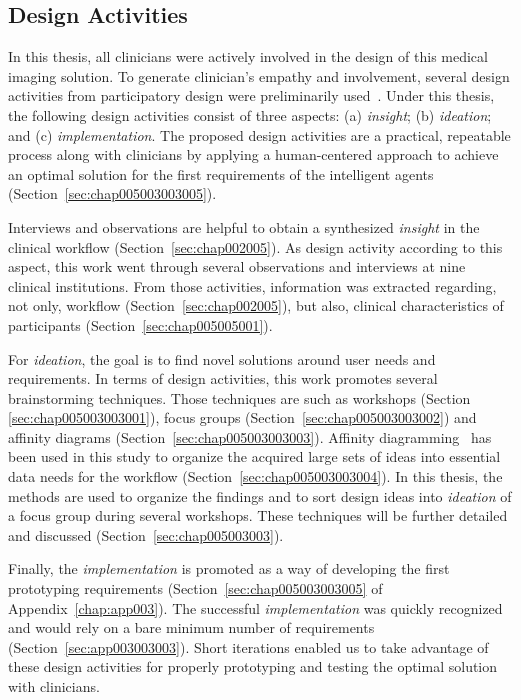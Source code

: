 \subsection{Design Activities}
\label{sec:chap005003001}

In this thesis, all clinicians were actively involved in the design of this medical imaging solution.
To generate clinician's empathy and involvement, several design activities from participatory design were preliminarily used~\cite{10.1145/3308558.3314123}.
Under this thesis, the following design activities consist of three aspects: (a) {\it insight}; (b) {\it ideation}; and (c) {\it implementation}.
The proposed design activities are a practical, repeatable process along with clinicians by applying a human-centered approach to achieve an optimal solution for the first requirements of the intelligent agents (Section~\ref{sec:chap005003003005}).

Interviews and observations are helpful to obtain a synthesized {\it insight} in the clinical workflow (Section~\ref{sec:chap002005}).
As design activity according to this aspect, this work went through several observations and interviews at nine clinical institutions.
From those activities, information was extracted regarding, not only, workflow (Section~\ref{sec:chap002005}), but also, clinical characteristics of participants (Section~\ref{sec:chap005005001}).

For {\it ideation}, the goal is to find novel solutions around user needs and requirements.
In terms of design activities, this work promotes several brainstorming techniques.
Those techniques are such as workshops (Section \ref{sec:chap005003003001}), focus groups (Section~\ref{sec:chap005003003002}) and affinity diagrams (Section~\ref{sec:chap005003003003}).
Affinity diagramming~\cite{harrington2016affinity} has been used in this study to organize the acquired large sets of ideas into essential data needs for the workflow (Section~\ref{sec:chap005003003004}).
In this thesis, the methods are used to organize the findings and to sort design ideas into {\it ideation} of a focus group during several workshops.
These techniques will be further detailed and discussed (Section~\ref{sec:chap005003003}).

Finally, the {\it implementation} is promoted as a way of developing the first prototyping requirements (Section~\ref{sec:chap005003003005} of Appendix~\ref{chap:app003}).
The successful {\it implementation} was quickly recognized and would rely on a bare minimum number of requirements (Section~\ref{sec:app003003003}).
Short iterations enabled us to take advantage of these design activities for properly prototyping and testing the optimal solution with clinicians.

